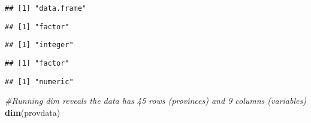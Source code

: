 \documentclass[]{article}
\newenvironment{Shaded}{\begin{snugshade}}{\end{snugshade}}
\newcommand{\CommentTok}[1]{\textcolor[rgb]{0.56,0.35,0.01}{\textit{#1}}}
\newcommand{\KeywordTok}[1]{\textcolor[rgb]{0.13,0.29,0.53}{\textbf{#1}}}
\newcommand{\NormalTok}[1]{#1}
\newcommand{\OperatorTok}[1]{\textcolor[rgb]{0.81,0.36,0.00}{\textbf{#1}}}
\begin{document}
\begin{verbatim}
## [1] "data.frame"
\end{verbatim}

\begin{Shaded}
\end{Shaded}

\begin{verbatim}
## [1] "factor"
\end{verbatim}

\begin{Shaded}
\end{Shaded}

\begin{verbatim}
## [1] "integer"
\end{verbatim}

\begin{Shaded}
\end{Shaded}

\begin{verbatim}
## [1] "factor"
\end{verbatim}

\begin{Shaded}
\end{Shaded}

\begin{verbatim}
## [1] "numeric"
\end{verbatim}

\begin{Shaded}
\begin{Highlighting}[]
\CommentTok{\#Running dim reveals the data has 45 rows (provinces) and 9 columns (variables)}
\KeywordTok{dim}\NormalTok{(provdata)}
\end{Highlighting}
\end{Shaded}
\end{document}
